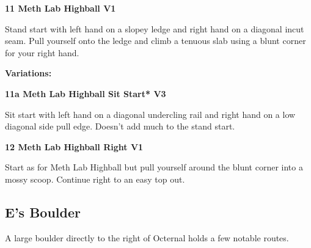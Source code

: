 \begin{multicols}{2}
\begin{minipage}{\columnwidth}
			\end{minipage}
			

					\begin{minipage}{\linewidth}	
					\label{rt:Meth Lab Highball}
\colorbox{green!20}{
\parbox{0.95\textwidth}{
\textbf{
11 Meth Lab Highball V1    \warn 
}
}
}

					\begin{adjustwidth}{0.5cm}{}				
					Stand start with left hand on a slopey ledge and right hand on a diagonal incut seam. Pull yourself onto the ledge and climb a tenuous slab using a blunt corner for your right hand.
					\end{adjustwidth}
					\end{minipage}
						\begin{adjustwidth}{0.5cm}{}				
						\textbf{Variations:} \newline
							\begin{minipage}{\linewidth}	
							\label{vr:Meth Lab Highball Sit Start}
\colorbox{green!20}{
\parbox{0.95\textwidth}{
\textbf{
11a Meth Lab Highball Sit Start* V3   
}
}
}

							\begin{adjustwidth}{0.5cm}{}				
							Sit start with left hand on a diagonal undercling rail and right hand on a low diagonal side pull edge. Doesn't add much to the stand start.
							\end{adjustwidth}
							\end{minipage}
						\end{adjustwidth}
					\begin{minipage}{\linewidth}	
					\label{rt:Meth Lab Highball Right}
\colorbox{green!20}{
\parbox{0.95\textwidth}{
\textbf{
12 Meth Lab Highball Right V1   
}
}
}

					\begin{adjustwidth}{0.5cm}{}				
					Start as for Meth Lab Highball but pull yourself around the blunt corner into a mossy scoop. Continue right to an easy top out.
					\end{adjustwidth}
					\end{minipage}
			\begin{minipage}{\columnwidth}
			\subsection*{E's Boulder}\label{bf:E's Boulder}
			A large boulder directly to the right of Octernal holds a few notable routes.
			

\end{minipage}
\end{multicols}
